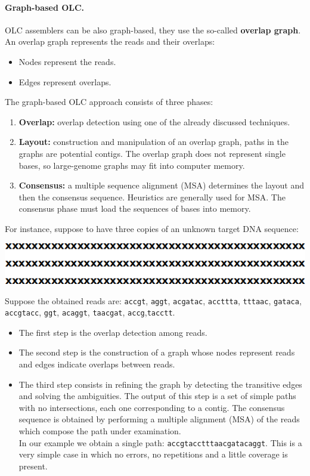 \paragraph*{Graph-based OLC.} OLC assemblers can be also graph-based, they use the so-called \textbf{overlap graph}. An overlap graph represents the reads and their overlaps:
\begin{itemize}
	\item Nodes represent the reads.
	\item Edges represent overlaps.
\end{itemize}
The graph-based OLC approach consists of three phases:
\begin{enumerate}
	\item \textbf{Overlap:} overlap detection using one of the already discussed techniques.
	\item \textbf{Layout:} construction and manipulation of an overlap graph, paths in the graphs are potential contigs. The overlap graph does not represent single bases, so large-genome graphs may fit into computer memory.
	\item \textbf{Consensus:} a multiple sequence alignment (MSA) determines the layout and then the consensus sequence. Heuristics are generally used for MSA. The consensus phase must load the sequences of bases into memory.
\end{enumerate}
For instance, suppose to have three copies of an unknown target DNA sequence:
\begin{center}
	\includegraphics[width=0.8\columnwidth]{img/example_graphOLC}
\end{center}
Suppose the obtained reads are: \verb|accgt|, \verb|aggt|, \verb|acgatac|, \verb|accttta|, \verb|tttaac|, \verb|gataca|, \verb|accgtacc|, \verb|ggt|, \verb|acaggt|, \verb|taacgat|, \verb|accg|,\verb|tacctt|.
\begin{itemize}
	\item The first step is the overlap detection among reads.
	\item The second step is the construction of a graph whose nodes represent reads and edges indicate overlaps between reads.
	\item The third step consists in refining the graph by detecting the transitive edges and solving the ambiguities. The output of this step is a set of simple paths with no intersections, each one corresponding to a contig. The consensus sequence is obtained by performing a multiple alignment (MSA) of the reads which compose the path under examination.\\
	In our example we obtain a single path: \verb|accgtacctttaacgatacaggt|. This is a very simple case in which no errors, no repetitions and a little coverage is present.
\end{itemize}



